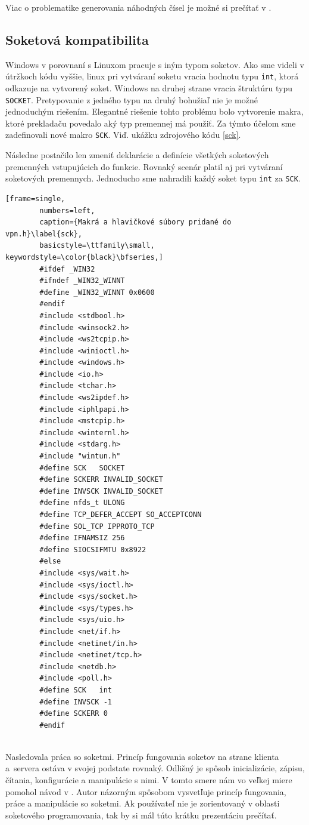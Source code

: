 Viac o problematike generovania náhodných čísel je možné si prečítať v \cite{bc}.
\subsection{Soketová kompatibilita}
Windows v porovnaní s Linuxom pracuje s iným typom soketov. Ako sme videli v útržkoch kódu vyššie, linux pri vytváraní soketu vracia hodnotu typu \lstinline|int|, ktorá odkazuje na vytvorený soket. Windows na druhej strane vracia štruktúru typu \lstinline|SOCKET|. Pretypovanie z jedného typu na druhý bohužiaľ nie je možné jednoduchým riešením. Elegantné riešenie tohto problému bolo vytvorenie makra, ktoré prekladaču povedalo aký typ premennej má použiť. Za týmto účelom sme zadefinovali nové makro \lstinline|SCK|. Viď. ukážku zdrojového kódu \ref{sck}.

Následne postačilo len zmeniť deklarácie a definície všetkých soketových premenných vstupujúcich do funkcie. Rovnaký scenár platil aj pri vytváraní soketových premennych. Jednoducho sme nahradili každý soket typu \lstinline|int| za \lstinline|SCK|.   

\begin{minipage}{\linewidth} 	
	\begin{lstlisting}[frame=single,
		numbers=left,
		caption={Makrá a hlavičkové súbory pridané do vpn.h}\label{sck},
		basicstyle=\ttfamily\small, keywordstyle=\color{black}\bfseries,]
		#ifdef _WIN32
		#ifndef _WIN32_WINNT
		#define _WIN32_WINNT 0x0600
		#endif
		#include <stdbool.h>
		#include <winsock2.h>
		#include <ws2tcpip.h>
		#include <winioctl.h>
		#include <windows.h>
		#include <io.h>
		#include <tchar.h>
		#include <ws2ipdef.h>
		#include <iphlpapi.h>
		#include <mstcpip.h>
		#include <winternl.h>
		#include <stdarg.h>
		#include "wintun.h"
		#define SCK   SOCKET
		#define SCKERR INVALID_SOCKET
		#define INVSCK INVALID_SOCKET
		#define nfds_t ULONG
		#define TCP_DEFER_ACCEPT SO_ACCEPTCONN
		#define SOL_TCP IPPROTO_TCP
		#define IFNAMSIZ 256
		#define SIOCSIFMTU 0x8922 
		#else
		#include <sys/wait.h>
		#include <sys/ioctl.h>
		#include <sys/socket.h>
		#include <sys/types.h>
		#include <sys/uio.h>
		#include <net/if.h>
		#include <netinet/in.h>
		#include <netinet/tcp.h>
		#include <netdb.h>
		#include <poll.h>
		#define SCK   int
		#define INVSCK -1
		#define SCKERR 0
		#endif
	\end{lstlisting}
\end{minipage}\\ 

Nasledovala práca so soketmi. Princíp fungovania soketov na strane klienta a~servera ostáva v svojej podstate rovnaký. Odlišný je spôsob inicializácie, zápisu, čítania, konfigurácie a manipulácie s nimi. V tomto smere nám vo veľkej miere pomohol návod v \cite{sck}. Autor názorným spôsobom vysvetľuje princíp fungovania, práce a manipulácie so soketmi. Ak používateľ nie je zorientovaný v oblasti soketového programovania, tak by si mál túto krátku prezentáciu prečítať.

